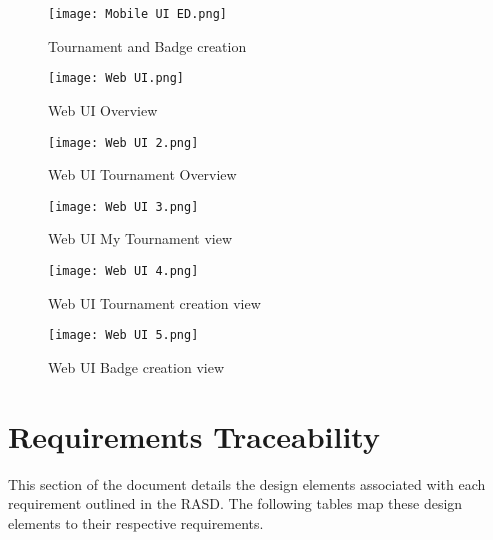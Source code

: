 \documentclass{article}
\begin{document}
\begin{figure}[H]
    \centering
    \texttt{[image: Mobile UI ED.png]}
    \caption{Tournament and Badge creation}
\end{figure}

\begin{figure}[H]
    \centering
    \texttt{[image: Web UI.png]}
    \caption{Web UI Overview}
\end{figure}

\begin{figure}[H]
    \centering
    \texttt{[image: Web UI 2.png]}
    \caption{Web UI Tournament Overview}
\end{figure}

\begin{figure}[H]
    \centering
    \texttt{[image: Web UI 3.png]}
    \caption{Web UI My Tournament view}
\end{figure}

\begin{figure}[H]
    \centering
    \texttt{[image: Web UI 4.png]}
    \caption{Web UI Tournament creation view}
\end{figure}

\begin{figure}[H]
    \centering
    \texttt{[image: Web UI 5.png]}
    \caption{Web UI Badge creation view}
\end{figure}
\newpage
\section{Requirements Traceability}
This section of the document details the design elements associated with each requirement outlined in the RASD. The following tables map these design elements to their respective requirements. \\
\end{document}
